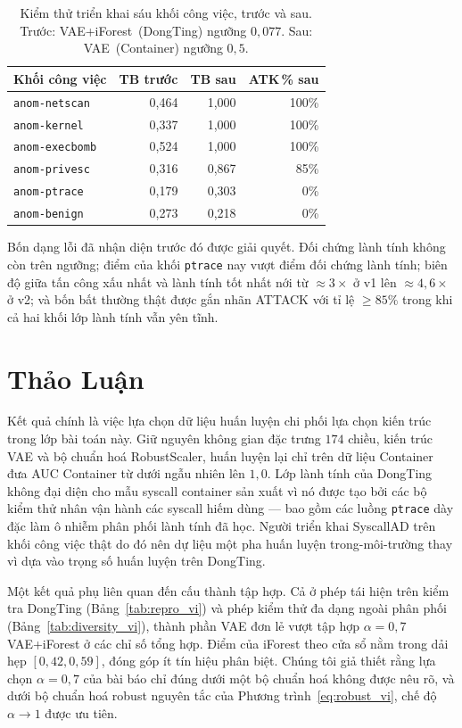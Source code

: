 \begin{table}[!t]
\centering
\caption{Kiểm thử triển khai sáu khối công việc, trước và sau.
Trước: VAE+iForest~(DongTing) ngưỡng $0{,}077$.
Sau: VAE~(Container) ngưỡng $0{,}5$.}
\label{tab:v2_multipod_vi}
\begin{tabular}{lrrr}
\toprule
Khối công việc         & TB trước & TB sau & ATK\,\% sau \\
\midrule
\texttt{anom-netscan}   & 0,464 & 1,000 & 100\% \\
\texttt{anom-kernel}    & 0,337 & 1,000 & 100\% \\
\texttt{anom-execbomb}  & 0,524 & 1,000 & 100\% \\
\texttt{anom-privesc}   & 0,316 & 0,867 & 85\%  \\
\texttt{anom-ptrace}    & 0,179 & 0,303 & 0\%   \\
\texttt{anom-benign}    & 0,273 & 0,218 & 0\%   \\
\bottomrule
\end{tabular}
\end{table}

Bốn dạng lỗi đã nhận diện trước đó được giải quyết. Đối chứng lành
tính không còn trên ngưỡng; điểm của khối \texttt{ptrace} nay vượt
điểm đối chứng lành tính; biên độ giữa tấn công xấu nhất và lành
tính tốt nhất nới từ $\approx\!3\times$ ở v1 lên $\approx\!4{,}6\times$
ở v2; và bốn bất thường thật được gắn nhãn ATTACK với tỉ lệ $\ge\!85\%$
trong khi cả hai khối lớp lành tính vẫn yên tĩnh.

\FloatBarrier
\section{Thảo Luận}
\label{sec:discussion_vi}

Kết quả chính là việc lựa chọn dữ liệu huấn luyện chi phối lựa chọn
kiến trúc trong lớp bài toán này. Giữ nguyên không gian đặc trưng
$174$ chiều, kiến trúc VAE và bộ chuẩn hoá RobustScaler, huấn luyện
lại chỉ trên dữ liệu Container đưa AUC Container từ dưới ngẫu nhiên
lên $1{,}0$. Lớp lành tính của DongTing không đại diện cho mẫu syscall
container sản xuất vì nó được tạo bởi các bộ kiểm thử nhân vận hành
các syscall hiếm dùng --- bao gồm các luồng \texttt{ptrace} dày đặc
làm ô nhiễm phân phối lành tính đã học. Người triển khai SyscallAD
trên khối công việc thật do đó nên dự liệu một pha huấn luyện
trong-môi-trường thay vì dựa vào trọng số huấn luyện trên DongTing.

Một kết quả phụ liên quan đến cấu thành tập hợp. Cả ở phép tái hiện
trên kiểm tra DongTing (Bảng~\ref{tab:repro_vi}) và phép kiểm thử đa
dạng ngoài phân phối (Bảng~\ref{tab:diversity_vi}), thành phần VAE
đơn lẻ vượt tập hợp $\alpha=0{,}7$ VAE+iForest ở các chỉ số tổng hợp.
Điểm của iForest theo cửa sổ nằm trong dải hẹp $[0{,}42, 0{,}59]$,
đóng góp ít tín hiệu phân biệt. Chúng tôi giả thiết rằng lựa chọn
$\alpha=0{,}7$ của bài báo chỉ đúng dưới một bộ chuẩn hoá không được
nêu rõ, và dưới bộ chuẩn hoá robust nguyên tắc của
Phương trình~\ref{eq:robust_vi}, chế độ $\alpha\!\to\!1$ được ưu tiên.

